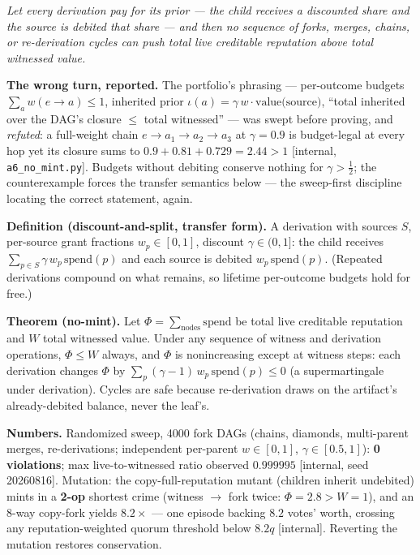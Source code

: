 \documentclass[11pt,a4paper]{article}
\newcommand{\onebreath}[1]{\begin{center}\emph{#1}\end{center}}
\begin{document}
\onebreath{Let every derivation \emph{pay} for its prior --- the child receives a discounted share and the source is debited that share --- and then no sequence of forks, merges, chains, or re-derivation cycles can push total live creditable reputation above total witnessed value.}

\textbf{The wrong turn, reported.} The portfolio's phrasing --- per-outcome budgets $\sum_a w(e\to a)\le1$, inherited prior $\iota(a)=\gamma\,w\cdot\text{value(source)}$, ``total inherited over the DAG's closure $\le$ total witnessed'' --- was swept before proving, and \emph{refuted}: a full-weight chain $e\to a_1\to a_2\to a_3$ at $\gamma=0.9$ is budget-legal at every hop yet its closure sums to $0.9+0.81+0.729=2.44>1$ [internal, \texttt{a6\_no\_mint.py}]. Budgets without debiting conserve nothing for $\gamma>\tfrac12$; the counterexample forces the transfer semantics below --- the sweep-first discipline locating the correct statement, again.

\begin{thebox}
\textbf{Definition (discount-and-split, transfer form).} A derivation with sources $S$, per-source grant fractions $w_p\in[0,1]$, discount $\gamma\in(0,1]$: the child receives $\sum_{p\in S}\gamma\,w_p\,\mathrm{spend}(p)$ and each source is debited $w_p\,\mathrm{spend}(p)$. (Repeated derivations compound on what remains, so lifetime per-outcome budgets hold for free.)

\textbf{Theorem (no-mint).} Let $\Phi=\sum_{\text{nodes}}\mathrm{spend}$ be total live creditable reputation and $W$ total witnessed value. Under any sequence of witness and derivation operations, $\Phi\le W$ always, and $\Phi$ is nonincreasing except at witness steps: each derivation changes $\Phi$ by $\sum_p(\gamma-1)\,w_p\,\mathrm{spend}(p)\le0$ (a supermartingale under derivation). Cycles are safe because re-derivation draws on the artifact's already-debited balance, never the leaf's.
\end{thebox}

\textbf{Numbers.} Randomized sweep, 4000 fork DAGs (chains, diamonds, multi-parent merges, re-derivations; independent per-parent $w\in[0,1]$, $\gamma\in[0.5,1]$): \textbf{0 violations}; max live-to-witnessed ratio observed $0.999995$ [internal, seed 20260816]. Mutation: the copy-full-reputation mutant (children inherit undebited) mints in a \textbf{2-op} shortest crime (witness $\to$ fork twice: $\Phi=2.8>W=1$), and an 8-way copy-fork yields $8.2\times$ --- one episode backing $8.2$ votes' worth, crossing any reputation-weighted quorum threshold below $8.2q$ [internal]. Reverting the mutation restores conservation.
\end{document}
